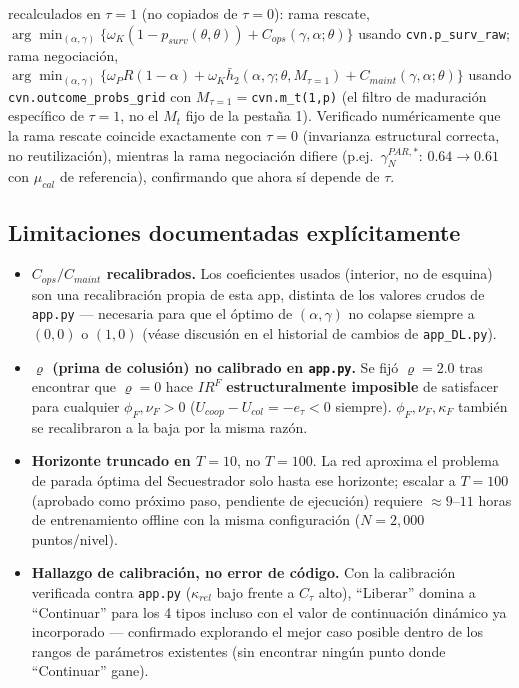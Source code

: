 \documentclass[ecta,nameyear,draft]{econsocart}
\newcommand{\pyfile}[1]{\texttt{#1}}
\newcommand{\pyvar}[1]{\texttt{#1}}
\begin{document}
\begin{description}[leftmargin=1.4cm, style=nextline]
{recalculados} en $\tau=1$ (no copiados de $\tau=0$): rama rescate,
$\arg\min_{(\alpha,\gamma)}\{\omega_K(1-p_{surv}(\theta,\theta))+C_{ops}(\gamma,\alpha;\theta)\}$
usando \pyvar{cvn.p\_surv\_raw}; rama negociación,
$\arg\min_{(\alpha,\gamma)}\{\omega_P R(1-\alpha)+\omega_K\bar h_2(\alpha,\gamma;\theta,M_{\tau=1})+C_{maint}(\gamma,\alpha;\theta)\}$
usando \pyvar{cvn.outcome\_probs\_grid} con $M_{\tau=1}=$\pyvar{cvn.m\_t(1,p)} (el filtro de
maduración específico de $\tau=1$, no el $M_t$ fijo de la pestaña 1). Verificado numéricamente
que la rama rescate coincide exactamente con $\tau=0$ (invarianza estructural correcta, no
reutilización), mientras la rama negociación difiere (p.ej.\ $\gamma_N^{PAR,\ast}$: $0.64\to0.61$
con $\mu_{cal}$ de referencia), confirmando que ahora sí depende de $\tau$.
\end{description}

\subsection{Limitaciones documentadas explícitamente}\label{sec:tau1-limitaciones}

\begin{itemize}
\item \textbf{$C_{ops}/C_{maint}$ recalibrados.} Los coeficientes usados (interior, no de
esquina) son una recalibración propia de esta app, distinta de los valores crudos de
\pyfile{app.py} --- necesaria para que el óptimo de $(\alpha,\gamma)$ no colapse siempre a
$(0,0)$ o $(1,0)$ (véase discusión en el historial de cambios de \pyfile{app\_DL.py}).
\item \textbf{$\varrho$ (prima de colusión) no calibrado en \pyfile{app.py}.} Se fijó
$\varrho=2.0$ tras encontrar que $\varrho=0$ hace $IR^F$ \textbf{estructuralmente imposible}
de satisfacer para cualquier $\phi_F,\nu_F>0$ ($U_{coop}-U_{col}=-e_\tau<0$ siempre). $\phi_F,\nu_F,\kappa_F$
también se recalibraron a la baja por la misma razón.
\item \textbf{Horizonte truncado en $T=10$}, no $T=100$. La red aproxima el problema de parada
óptima del Secuestrador solo hasta ese horizonte; escalar a $T=100$ (aprobado como próximo
paso, pendiente de ejecución) requiere $\approx 9$--$11$ horas de entrenamiento offline con la
misma configuración ($N=2{,}000$ puntos/nivel).
\item \textbf{Hallazgo de calibración, no error de código.} Con la calibración verificada
contra \pyfile{app.py} ($\kappa_{rel}$ bajo frente a $C_\tau$ alto), ``Liberar'' domina a
``Continuar'' para los 4 tipos incluso con el valor de continuación dinámico ya incorporado
--- confirmado explorando el mejor caso posible dentro de los rangos de parámetros existentes
(sin encontrar ningún punto donde ``Continuar'' gane).
\end{itemize}
\end{document}
